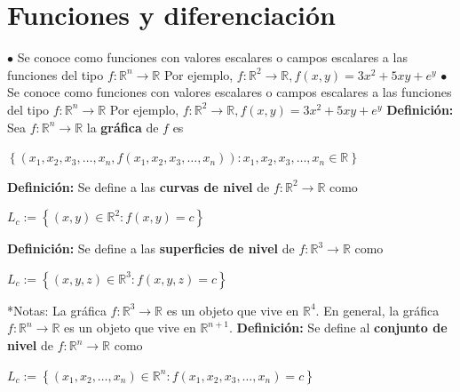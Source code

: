 \documentclass[12pt]{article}
\begin{document}
\newpage
\section{Funciones y diferenciación}
\noindent$ \bullet$ Se conoce como funciones con valores escalares o campos escalares a las funciones del tipo $f: \mathbb{R}^n\rightarrow\mathbb{R}$\newline
Por ejemplo, $f: \mathbb{R}^2\rightarrow\mathbb{R}, f(x,y)=3x^2+5xy+e^y$\newline
\newline
$ \bullet$ Se conoce como funciones con valores escalares o campos escalares a las funciones del tipo $f: \mathbb{R}^n\rightarrow\mathbb{R}$\newline
Por ejemplo, $f: \mathbb{R}^2\rightarrow\mathbb{R}, f(x,y)=3x^2+5xy+e^y$\newline
\newline
\textbf{Definición:} Sea $f: \mathbb{R}^n\rightarrow\mathbb{R}$ la \textbf{gráfica} de $f$ es
\begin{center}
    $\left\{(x_1,x_2,x_3,\dots,x_n,f(x_1,x_2,x_3,\dots,x_n)):x_1,x_2,x_3,\dots,x_n\in\mathbb{R}\right\}$
\end{center}
\textbf{Definición:} Se define a las \textbf{curvas de nivel} de $f:\mathbb{R}^2\rightarrow\mathbb{R}$ como
\begin{center}
    $L_c:=\left\{(x,y)\in\mathbb{R}^2: f(x,y)=c\right\}$
\end{center}
\textbf{Definición:} Se define a las \textbf{superficies de nivel} de  $f: \mathbb{R}^3\rightarrow\mathbb{R}$ como
\begin{center}
    $L_c:=\left\{(x,y,z)\in\mathbb{R}^3: f(x,y,z)=c\right\}$
\end{center}
*Notas: La gráfica $f:\mathbb{R}^3\rightarrow\mathbb{R}$ es un objeto que vive en $\mathbb{R}^4$. En general,
 la gráfica $f:\mathbb{R}^n\rightarrow\mathbb{R}$ es un objeto que vive en $\mathbb{R}^{n+1}$.\newline
\textbf{Definición:} Se define al \textbf{conjunto de nivel} de  $f: \mathbb{R}^n\rightarrow\mathbb{R}$ como
 \begin{center}
     $L_c:=\left\{(x_1,x_2,\dots,x_n)\in\mathbb{R}^n: f(x_1,x_2,x_3,\dots,x_n)=c\right\}$
 \end{center}
\end{document}
